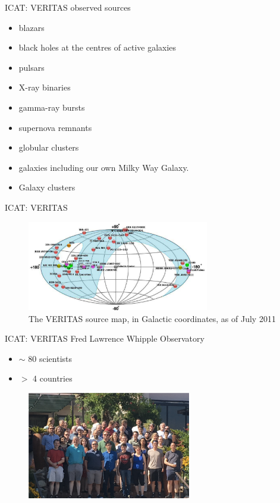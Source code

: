 \documentclass{beamer}
\begin{document}
\begin{frame}{ICAT: VERITAS}
    observed sources
    \begin{itemize}
        \item blazars
        \item black holes at the centres of active galaxies
        \item pulsars
        \item X-ray binaries
        \item gamma-ray bursts
        \item supernova remnants
        \item globular clusters
        \item galaxies including our own Milky Way Galaxy.
        \item Galaxy clusters
    \end{itemize}
\end{frame}


\begin{frame}{ICAT: VERITAS}
    \begin{figure}[h]
        \includegraphics[width=300px]{VERITAS_source_map.png}
        \caption{The VERITAS source map, in Galactic coordinates, as of July 2011}
    \end{figure}
\end{frame}


\begin{frame}{ICAT: VERITAS}
    Fred Lawrence Whipple Observatory
    \begin{itemize}
        \item $\sim$ 80 scientists
        \item $>$ 4 countries
    \end{itemize}
    \begin{figure}[h]
        \includegraphics[width=270px]{VERITAS_collaboration.png}
    \end{figure}
\end{frame}
\end{document}
